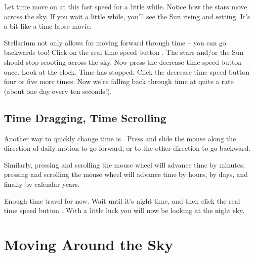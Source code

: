 Let time move on at this fast speed for a little while. Notice how the
stars move across the sky. If you wait a little while, you'll see the
Sun rising and setting. It's a bit like a time-lapse movie. 

Stellarium not only allows for moving forward through time -- you can
go backwards too! Click on the real time speed button
.  The stars and/or the
Sun should stop scooting across the sky. Now press the decrease time
speed button  once. Look
at the clock. Time has stopped. Click the decrease time speed button
four or five more times. Now we're falling back through time at quite
a rate (about one day every ten seconds!).

\subsection*{Time Dragging, Time Scrolling}
\label{sec:tour:timeDrag}

Another way to quickly change time is . Press
\keys{\ctrl} and slide the mouse along the direction of daily motion to go forward, 
or to the other direction to go backward.

Similarly, pressing \keys{\ctrl} and scrolling the mouse wheel will 
advance time by minutes, pressing \keys{\ctrl+\shift} and 
scrolling the mouse wheel will advance time by hours, \keys{\ctrl+\Alt} by days, 
and finally \keys{\ctrl+\shift+\Alt} by calendar years.


Enough time travel for now. Wait until it's night time, and then click
the real time speed button . With a 
little luck you will now be looking at the night sky.

\section{Moving Around the Sky}
\label{sec:tour:moving}


